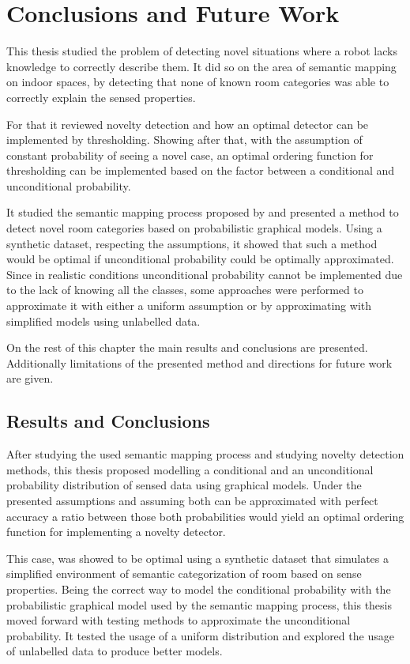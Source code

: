 \chapter{Conclusions and Future Work}\label{chap:conclusions}

This thesis studied the problem of detecting novel situations where a robot lacks knowledge to
correctly describe them.
It did so on the area of semantic mapping on indoor spaces, by detecting that none of known room
categories was able to correctly explain the sensed properties.

For that it reviewed novelty detection and how an optimal detector can be implemented by
thresholding. Showing after that, with the assumption of constant probability of seeing a
novel case, an optimal ordering function for thresholding can be implemented based on
the factor between a conditional and unconditional probability.

It studied the semantic mapping process proposed by \cite{pronobis2011semmap} and presented a method
to detect novel room categories based on probabilistic graphical models.
Using a synthetic dataset, respecting the assumptions, it showed that such a method would be optimal
if unconditional probability could be optimally approximated.
Since in realistic conditions unconditional probability cannot be implemented due to the lack of
knowing all the classes, some approaches were performed to approximate it with either a uniform
assumption or by approximating with simplified models using unlabelled data.

On the rest of this chapter the main results and conclusions are presented.
Additionally limitations of the presented method and directions for future work are given.


\section{Results and Conclusions}

After studying the used semantic mapping process and studying novelty detection methods, this
thesis proposed modelling a conditional and an unconditional probability distribution of sensed
data using graphical models. Under the presented assumptions and assuming both can be approximated
with perfect accuracy a ratio between those both probabilities would yield an optimal ordering
function for implementing a novelty detector.

This case, was showed to be optimal using a synthetic dataset that simulates a simplified
environment of semantic categorization of room based on sense properties.
Being the correct way to model the conditional probability with the probabilistic graphical model
used by the semantic mapping process, this thesis moved forward with testing methods to approximate
the unconditional probability. It tested the usage of a uniform distribution and explored the usage
of unlabelled data to produce better models.

